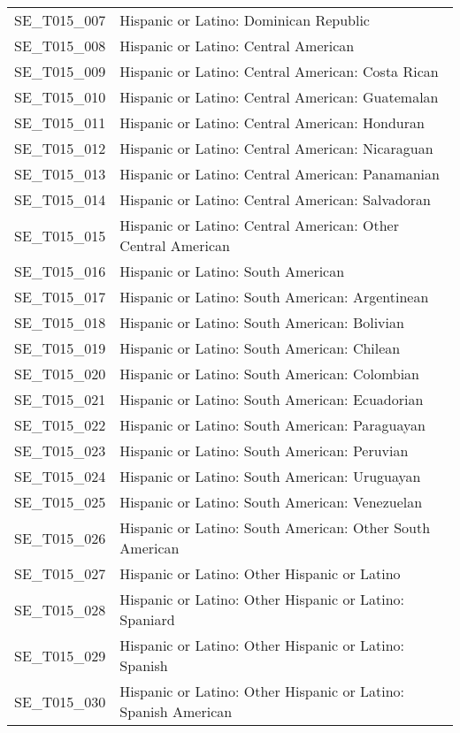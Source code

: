 \begin{longtable}{rp{5in}}
  SE\_T015\_007 & Hispanic or Latino: Dominican Republic \\ 
  SE\_T015\_008 & Hispanic or Latino: Central American \\ 
  SE\_T015\_009 & Hispanic or Latino: Central American: Costa Rican \\ 
  SE\_T015\_010 & Hispanic or Latino: Central American: Guatemalan \\ 
  SE\_T015\_011 & Hispanic or Latino: Central American: Honduran \\ 
  SE\_T015\_012 & Hispanic or Latino: Central American: Nicaraguan \\ 
  SE\_T015\_013 & Hispanic or Latino: Central American: Panamanian \\ 
  SE\_T015\_014 & Hispanic or Latino: Central American: Salvadoran \\ 
  SE\_T015\_015 & Hispanic or Latino: Central American: Other Central American \\ 
  SE\_T015\_016 & Hispanic or Latino: South American \\ 
  SE\_T015\_017 & Hispanic or Latino: South American: Argentinean \\ 
  SE\_T015\_018 & Hispanic or Latino: South American: Bolivian \\ 
  SE\_T015\_019 & Hispanic or Latino: South American: Chilean \\ 
  SE\_T015\_020 & Hispanic or Latino: South American: Colombian \\ 
  SE\_T015\_021 & Hispanic or Latino: South American: Ecuadorian \\ 
  SE\_T015\_022 & Hispanic or Latino: South American: Paraguayan \\ 
  SE\_T015\_023 & Hispanic or Latino: South American: Peruvian \\ 
  SE\_T015\_024 & Hispanic or Latino: South American: Uruguayan \\ 
  SE\_T015\_025 & Hispanic or Latino: South American: Venezuelan \\ 
  SE\_T015\_026 & Hispanic or Latino: South American: Other South American \\ 
  SE\_T015\_027 & Hispanic or Latino: Other Hispanic or Latino \\ 
  SE\_T015\_028 & Hispanic or Latino: Other Hispanic or Latino: Spaniard \\ 
  SE\_T015\_029 & Hispanic or Latino: Other Hispanic or Latino: Spanish \\ 
  SE\_T015\_030 & Hispanic or Latino: Other Hispanic or Latino: Spanish American \\ 

\end{longtable}
